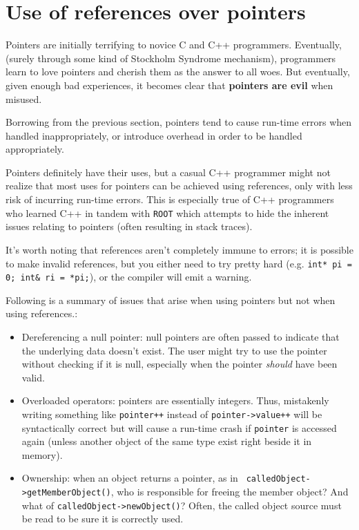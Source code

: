\documentclass[10pt,a4paper]{book}
\newcommand{\ROOT}{\Verb`ROOT` }
\begin{document}
\section{Use of references over pointers}

Pointers are initially terrifying to novice C and C++ programmers. Eventually, (surely through some kind of Stockholm Syndrome mechanism), programmers learn to love pointers and cherish them as the answer to all woes. But eventually, given enough bad experiences, it becomes clear that \textbf{pointers are evil} when misused.

Borrowing from the previous section, pointers tend to cause run-time errors when handled inappropriately, or introduce overhead in order to be handled appropriately.

Pointers definitely have their uses, but a casual C++ programmer might not realize that most uses for pointers can be achieved using references, only with less risk of incurring run-time errors. This is especially true of C++ programmers who learned C++ in tandem with \ROOT which attempts to hide the inherent issues relating to pointers (often resulting in stack traces).

It's worth noting that references aren't completely immune to errors; it is possible to make invalid references, but you either need to try pretty hard (e.g. \Verb`int* pi = 0; int& ri = *pi;`), or the compiler will emit a warning.

Following is a summary of issues that arise when using pointers but not when using references.:

\begin{itemize}
	\item Dereferencing a null pointer: null pointers are often passed to indicate that the underlying data doesn't exist. The user might try to use the pointer without checking if it is null, especially when the pointer \emph{should} have been valid.
	\item Overloaded operators: pointers are essentially integers. Thus, mistakenly writing something like \Verb`pointer++` instead of \Verb`pointer->value++` will be syntactically correct but will cause a run-time crash if \Verb`pointer` is accessed again (unless another object of the same type exist right beside it in memory).
	\item Ownership: when an object returns a pointer, as in \Verb` calledObject->getMemberObject()`, who is responsible for freeing the member object? And what of \Verb`calledObject->newObject()`? Often, the called object source must be read to be sure it is correctly used.
\end{itemize}
\end{document}
